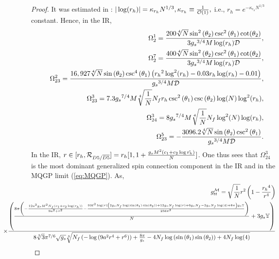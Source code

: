 \documentclass[a4paper,11pt,fleqn]{article}
\theoremstyle{plain}
\theoremstyle{definition}
\begin{document}
\begin{proof}
It was estimated in \cite{IITR-McGill-bulk-viscosity}: $|\log  (r_h) |=\kappa_{r_h}N^{1/3}, \kappa_{r_h}\equiv \frac{1}{{\cal O}(1)},$ i.e., $r_h=e^{-\kappa_{r_h}N^{1/3}}$ constant. Hence, in the IR,
\begin{eqnarray}
\label{dPhi-components}
& & \Omega^1_2 = \frac{200 \sqrt[4]{N} \sin ^2\left(\theta_2\right) \csc
   ^2\left(\theta_1\right) \cot (\theta_2)}{3 {g_s}^{3/4} M \log
   ({r_h}) {\cal D}},\nonumber\\
& &  \Omega^7_2=\frac{400 \sqrt[4]{N} \sin ^2\left(\theta_2\right) \csc
   ^2\left(\theta_1\right) \cot (\theta_2)}{3{g_s}^{3/4} M \log  (r_h) {\cal D}},\nonumber\\
 & & \Omega^2_{23}=\frac{16,927 \sqrt[4]{N} \sin \left(\theta_2\right) \csc
   ^4\left(\theta_1\right) \left({r_h}^2 \log
   ^2({r_h})-0.03 {r_h} \log
   ({r_h})-0.01\right)}{{g_s}^{3/4} M {\cal D} },\nonumber\\
& & \Omega^3_{23}=7.3 {g_s}^{7/4} M \sqrt[4]{\frac{1}{N}}  N_f 
   {r_h} \csc ^2\left(\theta_1\right) \csc \left(\theta_2\right) \log
   (N) \log ^2({r_h}),\nonumber\\
& & \Omega^3_{24}=8 {g_s}^{7/4} M \sqrt[4]{\frac{1}{N}}  N_f 
   \log ^2(N) \log ({r_h}),\nonumber\\
& & \Omega^5_{23}=-\frac{3096.2 \sqrt[4]{N} \sin \left(\theta_2\right) \csc
   ^2\left(\theta_1\right)}{{g_s}^{3/4} M  {\cal D}}.           
\end{eqnarray}
In the IR, $r\in[r_h, {\cal R}_{D5/\overline{D5}}] = r_h[1,1 + \frac{g_sM^2(c_1 + c_2 \log \tilde{r_h})}{N}]$. One thus sees that $\Omega^3_{24}$ is the most dominant generalized spin connection component in the IR and in the MQGP limit (\ref{eq:MQGP}).  As,
{\footnotesize
\begin{eqnarray}
\label{GMtt}
& & \hskip -0.8in g^{\cal M}_{tt} = \sqrt{\frac{1}{N}} r^2
   \left(1-\frac{{r_h}^4}{r^4}\right)\nonumber\\
   & & \hskip -0.8in \times\frac{\left(\frac{8 \pi 
   \left(-\frac{12 a^2 {g_s} M^2  N_f  ({c_1}+{c_2} \log
   ({r_h}))}{9 a^2+r^2}-\frac{9 M^2 \log (r) \left(2 {g_s}
    N_f  \log \left(\sin \left(\theta_1\right) \sin \left(\theta
   _2\right)\right)+12 {g_s}  N_f  \log (r)+6 {g_s}  N_f -2
   {g_s}  N_f  \log (4)+8 \pi \right) g_s\mathbb{Y}}{256 \pi ^3}\right)}{N}+3
   g_s\mathbb{Y}\right)}{8
   \sqrt[3]{3} \pi ^{7/6} \sqrt{{g_s}} \sqrt[3]{ N_f  \left(-\log
   \left(9 a^2 r^4+r^6\right)\right)+\frac{8 \pi }{{g_s}}-4  N_f 
   \log \left(\sin \left(\theta_1\right) \sin \left(\theta
   _2\right)\right)+4  N_f  \log (4)}}\nonumber\\

\end{eqnarray}}
\end{proof}
\end{document}
